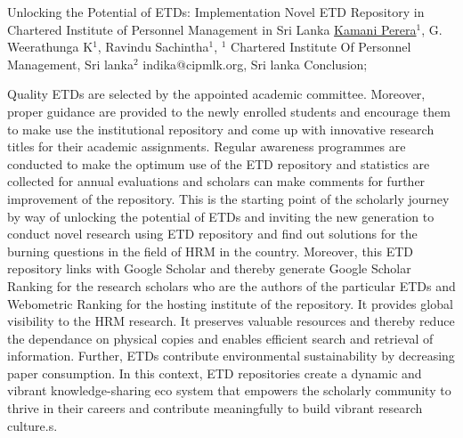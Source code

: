 \begin{abstract_online}{Unlocking the Potential of ETDs: Implementation Novel ETD Repository in Chartered Institute of Personnel Management in Sri Lanka}{%
        \underline{Kamani Perera}$^{1}$, G. Weerathunga K$^{1}$, Ravindu Sachintha$^{1}$,
        }{%
        $^1$ Chartered Institute Of Personnel Management, Sri lanka\newline{}$^2$ indika@cipmlk.org, Sri lanka}
	Conclusion;
	
	Quality ETDs are selected by the appointed academic committee. Moreover, proper guidance are provided to the newly enrolled students and encourage them to make use the institutional repository and come up with innovative research titles for their academic assignments. Regular awareness programmes are conducted to make the optimum use of the ETD repository and statistics are collected for annual evaluations and scholars can make comments for further improvement of the repository. This is the starting point of the scholarly journey by way of unlocking the potential of ETDs and inviting the new generation to conduct novel research using ETD repository and find out solutions for the burning questions in the field of HRM in the country. Moreover, this ETD repository links with Google Scholar and thereby generate Google Scholar Ranking for the research scholars who are the authors of the particular ETDs and Webometric Ranking for the hosting institute of the repository. It provides global visibility to the HRM research. It preserves valuable resources and thereby reduce the dependance on physical copies and enables efficient search and retrieval of information. Further, ETDs contribute environmental sustainability by decreasing paper consumption. In this context, ETD repositories create a dynamic and vibrant knowledge-sharing eco system that empowers the scholarly community to thrive in their careers and contribute meaningfully to build vibrant research culture.s.
    \end{abstract_online}
    
